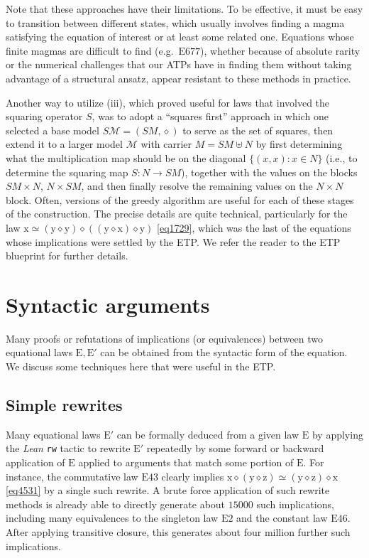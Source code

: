 \documentclass[12pt]{amsart}
\theoremstyle{definition}
\newcommand{\x}{\mathrm{x}}
\newcommand{\y}{\mathrm{y}}
\newcommand{\z}{\mathrm{z}}
\newcommand{\op}{\diamond}
\newcommand{\formaleq}{\simeq}
\newcommand{\Magma}{{\mathcal{M}}}
\newcommand{\Eq}[1]{\mathrm{E}#1}
\newcommand{\E}{\mathrm{E}}
\begin{document}
Note that these approaches have their limitations.  To be effective, it must be easy to transition between different
states, which usually involves finding a magma satisfying the equation of interest or at least some related one.
Equations whose finite magmas are difficult to find (e.g.\ $\Eq{677}$), whether because of absolute rarity or the numerical challenges
that our ATPs have in finding them without taking advantage of a structural ansatz, appear resistant to these methods in practice.

Another way to utilize (iii), which proved useful for laws that involved the squaring operator $S$, was to adopt a ``squares first'' approach in which one selected a base model $S\Magma = (SM,\op)$ to serve as the set of squares, then extend it to a larger model $\Magma$ with carrier $M = SM \uplus N$ by first determining what the multiplication map should be on the diagonal $\{ (x,x): x\in N\}$ (i.e., to determine the squaring map $S \colon N \to SM$), together with the values on the blocks $SM \times N$, $N \times SM$, and then finally resolve the remaining values on the $N \times N$ block.  Often, versions of the greedy algorithm are useful for each of these stages of the construction.  The precise details are quite technical, particularly for the law $\x \formaleq (\y \op \y) \op ((\y \op \x) \op \y)$ \eqref{eq1729}, which was the last of the equations whose implications were settled by the ETP.  We refer the reader to the ETP blueprint for further details.


\section{Syntactic arguments}\label{syntactic-sec}

Many proofs or refutations of implications (or equivalences) between two equational laws $\E,\E'$ can be obtained from the syntactic form of the equation.  We discuss some techniques here that were useful in the ETP.

\subsection{Simple rewrites}\label{rewrite-sec}

Many equational laws $\E'$ can be formally deduced from a given law $\E$ by applying the \emph{Lean} \texttt{rw} tactic to rewrite $\E'$ repeatedly by some forward or backward application of $\E$ applied to arguments that match some portion of $\E$.  For instance, the commutative law $\Eq{43}$ clearly implies $\x \op (\y \op \z) \formaleq (\y \op \z) \op \x$ \eqref{eq4531}
by a single such rewrite.  A brute force application of such rewrite methods is already able to directly generate about $\num{15000}$ such implications, including many equivalences to the singleton law $\Eq{2}$ and the constant law $\Eq{46}$.  After applying transitive closure, this generates about four million further such implications.
\end{document}
